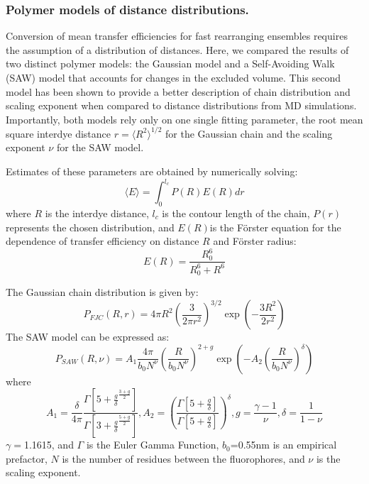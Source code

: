 \documentclass[../main.tex]{subfiles}
\begin{document}
    \subsubsection{Polymer models of distance distributions.}
        Conversion of mean transfer efficiencies for fast rearranging ensembles requires the assumption of a distribution of distances. Here, we compared the results of two distinct polymer models: the Gaussian model and a Self-Avoiding Walk (SAW) model that accounts for changes in the excluded volume\cite{Schafer2012-bh}. This second model has been shown to provide a better description of chain distribution and scaling exponent when compared to distance distributions from MD simulations\cite{Zheng2018-ej}. Importantly, both models rely only on one single fitting parameter, the root mean square interdye distance $r=\langle R^{2}\rangle^{1/2}$ for the Gaussian chain and the scaling exponent $\nu$ for the SAW model. 

        Estimates of these parameters are obtained by numerically solving: 
        \begin{equation}\label{appendix-e-eq12}
            \langle E\rangle=\int_0^{l_c}P(R)E(R)dr
        \end{equation}
        where $R$ is the interdye distance, $l_c$ is the contour length of the chain, $P(r)$ represents the chosen distribution, and $E(R)$is the Förster equation for the dependence of transfer efficiency on distance $R$ and Förster radius:
        \begin{equation}\label{appendix-e-eq13}
            E(R) = \frac{R_0^6}{R_0^6+R^6}
        \end{equation}

        The Gaussian chain distribution is given by:
        \begin{equation}\label{appendix-e-eq14}
            P_{FJC}(R,r)=4\pi R^2(\frac{3}{2\pi r^2})^{3/2}\exp(-\frac{3R^2}{2r^2})
        \end{equation} 
        The SAW model can be expressed as:
        \begin{equation}\label{appendix-e-eq15}
            P_{SAW}(R,\nu)=A_1\frac{4\pi}{b_0N^\nu}(\frac{R}{b_0N^\nu})^{2+g}\exp(-A_2(\frac{R}{b_0N^{\nu}})^\delta)
        \end{equation}
        where 
        \begin{equation}\label{appendix-e-eq16}
            A_1 = \frac{\delta}{4\pi}\frac{\Gamma[5+\frac{g}{\delta}^{\frac{3+g}{2}}]}{\Gamma[3+\frac{g}{\delta}^{\frac{5+g}{2}}]},
            A_2=(\frac{\Gamma[5+\frac{g}{\delta}]}{\Gamma[5+\frac{g}{\delta}]})^\delta,
            g=\frac{\gamma - 1}{\nu},
            \delta=\frac{1}{1-\nu}
        \end{equation}
        $\gamma =$1.1615, and $\Gamma$ is the Euler Gamma Function, $b_0$=0.55nm is an empirical prefactor\cite{Zheng2018-ej}, $N$ is the number of residues between the fluorophores, and $\nu$ is the scaling exponent.
\end{document}
